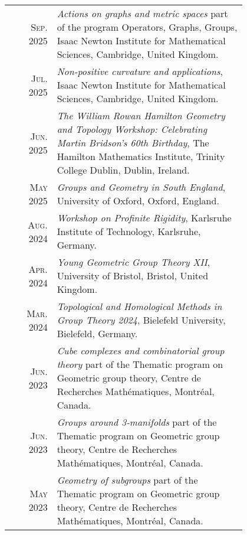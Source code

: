 \documentclass[a4paper,11pt]{article} %
\begin{document}
\begin{longtable}{rp{0.8\linewidth}}

	\textsc{Sep. 2025} &\emph{Actions on graphs and metric spaces} part of the program Operators, Graphs, Groups, Isaac Newton Institute for Mathematical Sciences, Cambridge, United Kingdom. \\ %

	\textsc{Jul. 2025} &\emph{Non-positive curvature and applications}, Isaac Newton Institute for Mathematical Sciences, Cambridge, United Kingdom. \\ %
	
	\textsc{Jun. 2025} & \emph{The William Rowan Hamilton Geometry and Topology Workshop: Celebrating Martin Bridson's 60th Birthday}, The Hamilton Mathematics Institute, Trinity College Dublin, Dublin, Ireland. \\ %
	
	\textsc{May 2025} & \emph{Groups and Geometry in South England}, University of Oxford, Oxford, England. \\ %

    \textsc{Aug. 2024} & \emph{Workshop on Profinite Rigidity}, Karlsruhe Institute of Technology, Karlsruhe,
    Germany. \\ %

    \textsc{Apr. 2024} & \emph{Young Geometric Group Theory XII}, University of Bristol, Bristol, United Kingdom. \\ %
    
    \textsc{Mar. 2024} & \emph{Topological and Homological Methods in Group Theory 2024}, Bielefeld
    University, Bielefeld, Germany. \\ %

    \textsc{Jun. 2023} & \emph{Cube complexes and combinatorial group theory} part of the Thematic program on Geometric group theory, Centre de Recherches Mathématiques, Montréal, Canada. \\ %
    
    \textsc{Jun. 2023} & \emph{Groups around 3-manifolds} part of the Thematic program on Geometric group theory,
    Centre de Recherches Mathématiques, Montréal, Canada. \\ %

    \textsc{May 2023} & \emph{Geometry of subgroups} part of the Thematic program on Geometric group theory, Centre
    de Recherches Mathématiques, Montréal, Canada. \\ %


\end{longtable}
\end{document}

